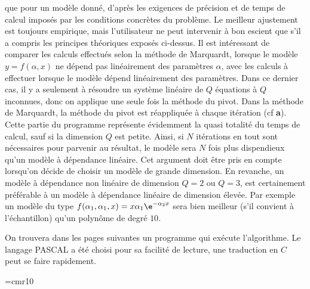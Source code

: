 que pour un mod\`ele donn\'e,  d'apr\`es les exigences de pr\'ecision et 
de temps de calcul impos\'es par les conditions concr\`etes du 
probl\`eme. Le meilleur ajustement est toujours empirique, mais 
l'utilisateur ne peut intervenir \`a bon escient que s'il a compris les 
principes th\'eoriques expos\'es ci-dessus. 
\medskip 
Il est int\'eressant de comparer les calculs effectu\'es selon la 
m\'ethode de Marquardt, lorsque le mod\`ele $y = f(\alpha , x)$ ne 
d\'epend pas lin\'eairement des param\`etres $\alpha$, avec les 
calculs \`a effectuer lorsque le mod\`ele d\'epend lin\'eairement des 
param\`etres. Dans ce dernier cas, il y a seulement \`a r\'esoudre un 
syst\`eme lin\'eaire de $Q$ \'equations \`a $Q$ inconnues, donc on 
applique une seule fois la m\'ethode du pivot.  Dans la m\'ethode de 
Marquardt, la m\'ethode du pivot est r\'eappliqu\'ee \`a chaque 
it\'eration (cf {\bf a}). Cette partie du programme repr\'esente 
\'evidemment la quasi totalit\'e du temps de calcul, sauf si la 
dimension $Q$ est petite. Ainsi, si $N$ it\'erations en tout sont 
n\'ecessaires pour parvenir au r\'esultat,  le mod\`ele sera $N$ fois 
plus dispendieux qu'un mod\`ele \`a d\'ependance lin\'eaire. Cet 
argument doit \^etre pris en compte lorsqu'on d\'ecide de choisir un 
mod\`ele de grande dimension. En revanche, un mod\`ele \`a 
d\'ependance non lin\'eaire de dimension $Q=2$ ou $Q=3$, est 
certainement pr\'ef\'erable \`a un mod\`ele \`a d\'ependance
lin\'eaire de dimension \'elev\'ee. Par exemple un mod\`ele du type 
$f(\alpha_1, \alpha_1, x) = x\alpha_1\e^{-\alpha_2 x}$ sera bien 
meilleur (s'il convient \`a l'\'echantillon) qu'un polyn\^ome de degr\'e 
$10$. 

\vskip20pt

{\eightpoint On trouvera dans les pages suivantes un programme qui 
ex\'ecute l'algorithme. Le langage {\eightrm PASCAL} a \'et\'e choisi 
pour sa facilit\'e de lecture, une traduction en $C$ peut se faire 
rapidement. \par} 

\vfill\break 

\hsize=160mm
\larg=160mm

\font\ko=cmr10
\def\iA{\hskip4.8mm}
\def\iB{\hskip9.6mm} 
\def\iC{\hskip14.4mm} 
 
